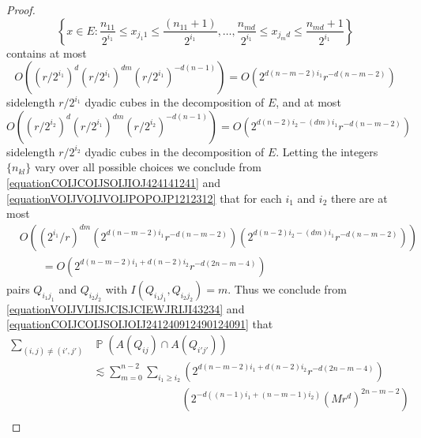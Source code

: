 \documentclass[dvipsnames,letterpaper,12pt]{article}
\numberwithin{equation}{section}
\numberwithin{theorem}{section}
\DeclareMathOperator{\PP}{\mathbb{P}}
\begin{document}
\begin{proof}
    \begin{equation}
        \left\{ x \in E : \frac{n_{11}}{2^{i_1}} \leq x_{j_1 1} \leq \frac{(n_{11} + 1)}{2^{i_1}}, \dots, \frac{n_{md}}{2^{i_1}} \leq x_{j_m d} \leq \frac{n_{md} + 1}{2^{i_1}} \right\}
    \end{equation}
    contains at most
    \begin{equation} \label{equationCOIJCOIJSOIJIOJ424141241}
        O \left( (r/2^{i_1})^d (r/2^{i_1})^{dm} (r/2^{i_1})^{-d(n-1)} \right) = O \left( 2^{d(n-m-2)i_1} r^{-d(n-m-2)} \right)
    \end{equation}
    sidelength $r/2^{i_1}$ dyadic cubes in the decomposition of $E$, and at most
    \begin{equation} \label{equationVOIJVOIJVOIJPOPOJP1212312}
        O \left( (r/2^{i_2})^d (r/2^{i_1})^{dm} (r/2^{i_2})^{-d(n-1)} \right) = O \left( 2^{d(n-2) i_2 - (dm) i_1} r^{-d(n-m-2)} \right)
    \end{equation}
    sidelength $r/2^{i_2}$ dyadic cubes in the decomposition of $E$. Letting the integers $\{ n_{kl} \}$ vary over all possible choices we conclude from \eqref{equationCOIJCOIJSOIJIOJ424141241} and \eqref{equationVOIJVOIJVOIJPOPOJP1212312} that for each $i_1$ and $i_2$ there are at most
    \begin{equation} \label{equationCOIJCOIJSOIJOIJ241240912490124091}
    \begin{split}
        &O \left( (2^{i_1}/r)^{dm} \left( 2^{d(n-m-2)i_1} r^{-d(n-m-2)} \right) \left( 2^{d(n-2) i_2 - (dm) i_1} r^{-d(n-m-2)} \right) \right)\\
        &\quad\quad = O \left( 2^{d(n - m - 2)i_1 + d(n-2) i_2} r^{-d(2n - m - 4)} \right)
    \end{split}
    \end{equation}
    pairs $Q_{i_1j_1}$ and $Q_{i_2j_2}$ with $I(Q_{i_1j_1},Q_{i_2j_2}) = m$. Thus we conclude from \eqref{equationVOIJVIJISJCISJCIEWJRIJI43234} and \eqref{equationCOIJCOIJSOIJOIJ241240912490124091} that
    \begin{equation} \label{equationPPOPOKPOPPPPPPDSDSD}
    \begin{split}
        \sum_{(i,j) \neq (i',j')}& \PP(A(Q_{ij}) \cap A(Q_{i'j'}))\\
        &\lesssim \sum_{m = 0}^{n-2} \sum_{i_1 \geq i_2} \left( 2^{d(n-m-2) i_1 + d(n-2) i_2} r^{-d(2n-m-4)} \right)\\
        &\quad\quad\quad\quad\quad\quad\quad\quad\left( 2^{-d((n-1)i_1 + (n-m-1) i_2)} (Mr^d)^{2n - m - 2} \right)\\

\end{split}
\end{equation}
\end{proof}
\end{document}
